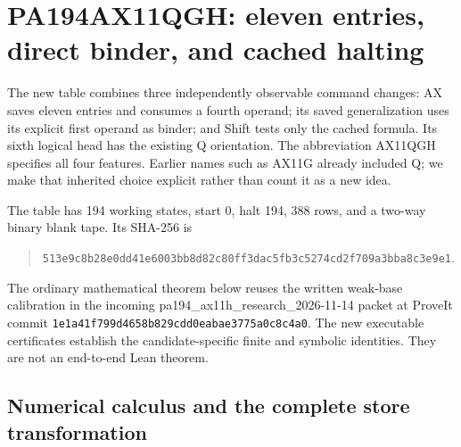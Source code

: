 \section{PA194AX11QGH: eleven entries, direct binder, and cached halting}
\label{sec:ax11qgh}

The new table combines three independently observable command changes:
AX saves eleven entries and consumes a fourth operand; its saved
generalization uses its explicit first operand as binder; and Shift
tests only the cached formula.  Its sixth logical head has the existing
Q orientation.  The abbreviation \textsf{AX11QGH} specifies all four
features.  Earlier names such as \textsf{AX11G} already included Q; we
make that inherited choice explicit rather than count it as a new idea.

The table has 194 working states, start 0, halt 194, 388 rows, and a
two-way binary blank tape.  Its SHA-256 is
\begin{quote}\small\texttt{513e9c8b28e0dd41e6003bb8d82c80ff3dac5fb3c5274cd2f709a3bba8c3e9e1}.
\end{quote}
The ordinary mathematical theorem below reuses the written weak-base
calibration in the incoming \textsf{pa194\_ax11h\_research\_2026-11-14}
packet at ProveIt commit
\nolinkurl{1e1a41f799d4658b829cdd0eabae3775a0c8c4a0}.
The new executable certificates establish the candidate-specific
finite and symbolic identities.  They are not an end-to-end Lean theorem.

\subsection{Numerical calculus and the complete store transformation}

